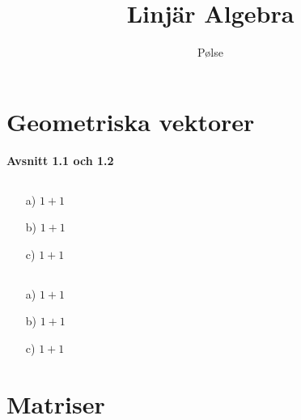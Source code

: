 \documentclass{article}
\title{Linjär Algebra}
\author{Pølse}
\begin{document}
    \maketitle
    \tableofcontents
    \pagebreak
    \section{Geometriska vektorer}
        \textbf{Avsnitt 1.1 och 1.2}
        \subsection{}
            \begin{enumerate}
                \item[a)]
                \begin{math}
                    1+1
                \end{math}
                \item[b)]
                \begin{math}
                    1+1
                \end{math}
                \item[c)]
                \begin{math}
                    1+1
                \end{math}
            \end{enumerate}
        \subsection{}
            \begin{enumerate}
                \item[a)]
                \begin{math}
                    1+1
                \end{math}
                \item[b)]
                \begin{math}
                    1+1
                \end{math}
                \item[c)]
                \begin{math}
                    1+1
                \end{math}
            \end{enumerate}
    \section{Matriser}
\end{document}
